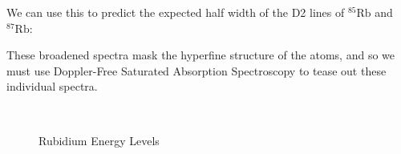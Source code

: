\documentclass[12pt]{article}
\begin{document}
We can use this to predict the expected half width of the D2 lines of ${}^{85}\text{Rb}$ and ${}^{87}\text{Rb}$:

These broadened spectra mask the hyperfine structure of the atoms, and so we must use Doppler-Free Saturated Absorption Spectroscopy to tease out these individual spectra.

\begin{figure}%
	\centering
	\,
	\caption{Rubidium Energy Levels}%
	\label{fig:RbEnergy}%
\end{figure}
\end{document}
